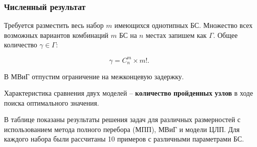 \begin{frame}
    \frametitle{Численный результат}

    Требуется разместить весь набор $m$ имеющихся однотипных БС. Множество всех возможных вариантов комбинаций $m$ БС на  $n$ местах запишем как $\Gamma$. Общее количество $\gamma \in \Gamma$:
   
    \begin{displaymath}
    \gamma = C_n^m \times m!.
    \end{displaymath} 

    В МВиГ отпустим ограничение на межконцевую задержку.
    
    \bigskip

    Характеристика сравнения двух моделей --  \textbf{количество}  \textbf{пройденных}  \textbf{узлов} в ходе поиска оптимального значения.
    
    \bigskip
    В таблице показаны результаты решения задач для различных размерностей с использованием метода полного перебора (МПП), МВиГ и модели ЦЛП. Для каждого набора  были рассчитаны 10 примеров с различными параметрами БС. 



\end{frame}


